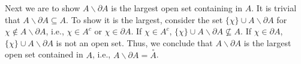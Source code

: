 \documentclass[12pt]{article}
\begin{document}
Next we are to show $A \smallsetminus \partial A $ is the largest open set containing in $A$. It is trivial that $A \smallsetminus \partial A \subseteq A$. To show it is the largest, consider the set $\{ \chi \} \cup A \smallsetminus \partial A $ for $\chi \notin A \smallsetminus \partial A $, i.e.,  $\chi \in A^c$ or $\chi \in \partial A$.
If $\chi \in A^c$, $\{ \chi \} \cup A \smallsetminus \partial A \not\subseteq A$. If $\chi \in \partial A$, $\{ \chi \} \cup A \smallsetminus \partial A$ is not an open set.
Thus, we conclude that $A \smallsetminus \partial A $ is the largest open set contained in $A$, i.e., $A \smallsetminus \partial A = \overset{\circ}{A}$.
\end{document}
